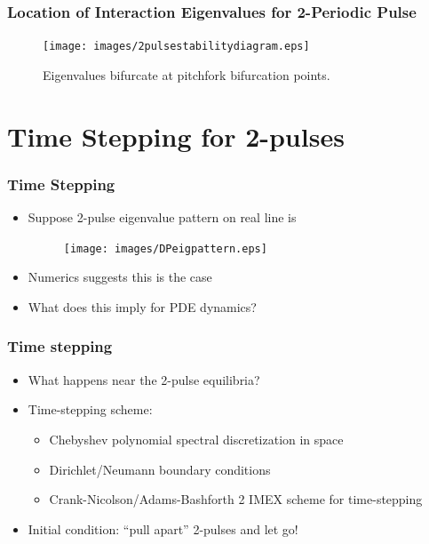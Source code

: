 \documentclass[16pt]{beamer}
\begin{document}
\begin{frame}
	\frametitle{Location of Interaction Eigenvalues for 2-Periodic Pulse}
	\fontsize{16}{7.2}\selectfont
		\begin{figure}
		\begin{center}
		\texttt{[image: images/2pulsestabilitydiagram.eps]}
		\end{center}
		\caption{Eigenvalues bifurcate at pitchfork bifurcation points.}
		\end{figure}
\end{frame}

\section{Time Stepping for 2-pulses}

\begin{frame}
	\frametitle{Time Stepping}
	\fontsize{16}{7.2}\selectfont
	\begin{itemize}
		\item Suppose 2-pulse eigenvalue pattern on real line is 
		\begin{figure}
		\begin{center}
		\texttt{[image: images/DPeigpattern.eps]}
		\end{center}
		\end{figure}
		\item Numerics suggests this is the case
		\vspace{0.5cm}
		\item What does this imply for PDE dynamics?
	\end{itemize}
\end{frame}

\begin{frame}
	\frametitle{Time stepping}
	\fontsize{16}{7.2}\selectfont
	\begin{itemize}
		\item What happens near the 2-pulse equilibria?
		\vspace{0.5cm}
		\item Time-stepping scheme:
		\begin{itemize}
			\item Chebyshev polynomial spectral discretization in space
			\item Dirichlet/Neumann boundary conditions
			\item Crank-Nicolson/Adams-Bashforth 2 IMEX scheme for time-stepping
		\end{itemize}
		\vspace{0.5cm}
		\item Initial condition: ``pull apart'' 2-pulses and let go!
	\end{itemize}
\end{frame}
\end{document}
